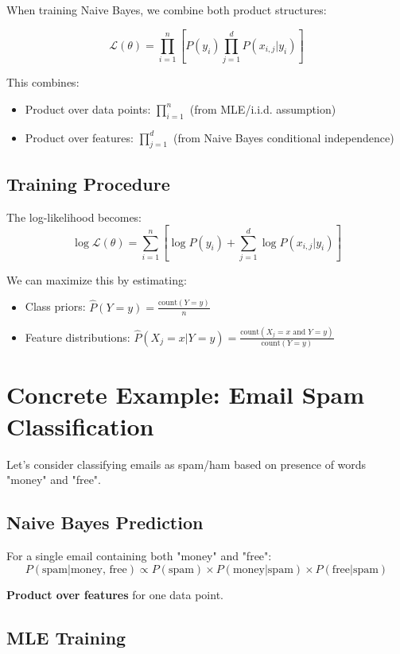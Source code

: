 \begin{notechapter}
When training Naive Bayes, we combine both product structures:

\[
\mathcal{L}(\theta) = \prod_{i=1}^n \left[ P(y_i) \prod_{j=1}^d P(x_{i,j}|y_i) \right]
\]

This combines:
\begin{itemize}
    \item Product over data points: $\prod_{i=1}^n$ (from MLE/i.i.d. assumption)
    \item Product over features: $\prod_{j=1}^d$ (from Naive Bayes conditional independence)
\end{itemize}

\subsection{Training Procedure}

The log-likelihood becomes:
\[
\log \mathcal{L}(\theta) = \sum_{i=1}^n \left[ \log P(y_i) + \sum_{j=1}^d \log P(x_{i,j}|y_i) \right]
\]

We can maximize this by estimating:
\begin{itemize}
    \item Class priors: $\hat{P}(Y=y) = \frac{\text{count}(Y=y)}{n}$
    \item Feature distributions: $\hat{P}(X_j=x|Y=y) = \frac{\text{count}(X_j=x \text{ and } Y=y)}{\text{count}(Y=y)}$
\end{itemize}

\section{Concrete Example: Email Spam Classification}

Let's consider classifying emails as spam/ham based on presence of words "money" and "free".

\subsection{Naive Bayes Prediction}

For a single email containing both "money" and "free":
\[
P(\text{spam}|\text{money, free}) \propto P(\text{spam}) \times P(\text{money}|\text{spam}) \times P(\text{free}|\text{spam})
\]

\textbf{Product over features} for one data point.

\subsection{MLE Training}


\end{notechapter}
